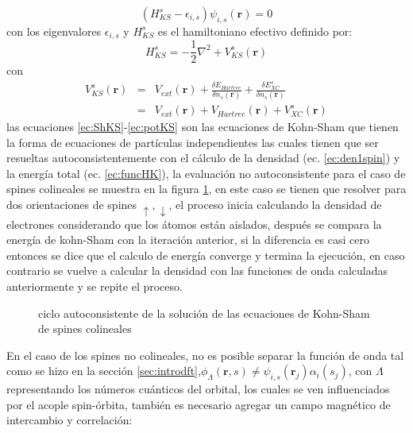 \documentclass[12pt,a4paper, oneside]{book}
\begin{document}
   \begin{equation}
   (H_{KS}^s -\epsilon_{i,s})\psi_{i,s } (\pmb{r}) = 0 \label{ec:ShKS}
   \end{equation}
   con los eigenvalores $\epsilon_{i,s} $   y $ H_{KS}^s $ es el hamiltoniano efectivo definido por:
   \begin{equation}
    H_{KS}^s = -\frac{1}{2} \nabla^2 + V_{KS}^s (\pmb{r}) \label{ec:HamiltonianoKS}
   \end{equation}
   con
   \begin{eqnarray}
     V_{KS}^s (\pmb{r}) &=& V_{ext} (\pmb{r})+  \frac{\delta E_{Hartree}}{\delta n_s (\pmb{r})}+  \frac{\delta E_{XC}^s}{\delta n_s (\pmb{r})} \nonumber \\
      &=& V_{ext} (\pmb{r})+ V_{Hartree} (\pmb{r}) + V_{XC}^s (\pmb{r}) \label{ec:potKS} 
   \end{eqnarray}
   las ecuaciones \ref{ec:ShKS}-\ref{ec:potKS} son las ecuaciones de Kohn-Sham que tienen la forma de ecuaciones de part\'iculas independientes las cuales tienen que ser resueltas autoconsistentemente con el c\'alculo de la densidad (ec. \ref{ec:den1spin}) y la energ\'ia total (ec. \ref{ec:funcHK}), la evaluaci\'on no autoconsistente para el caso de spines colineales se muestra en la figura \ref{fig:esq}, en este caso se tienen que resolver para dos orientaciones de spines $\uparrow, \downarrow$, el proceso inicia calculando la densidad de electrones considerando que los \'atomos est\'an aislados, despu\'es se compara la energ\'ia de kohn-Sham con la iteraci\'on anterior, si la diferencia es casi cero entonces se dice que el calculo de energ\'ia converge y termina la ejecuci\'on, en caso contrario se vuelve a calcular la densidad con las funciones de onda calculadas anteriormente y se repite el proceso. 
   \begin{figure}[!hbt]
   	\centering
   	\caption{ciclo autoconsistente de la soluci\'on de las ecuaciones de Kohn-Sham de spines colineales}
   	\label{fig:esq}
   \end{figure}
   \newline
   En el caso de los spines no colineales, no es posible separar la funci\'on de onda tal como se hizo en la secci\'on \ref{sec:introdft},$\phi_{\Lambda} (\pmb{r},s)\not = \psi_{i,s } (\pmb{r}_j) \alpha_i (s_j) $, con $\Lambda$ representando los n\'umeros cu\'anticos  del orbital, los cuales se ven influenciados por el acople spin-\'orbita, tambi\'en es necesario agregar un campo magn\'etico de intercambio y correlaci\'on:
\end{document}
